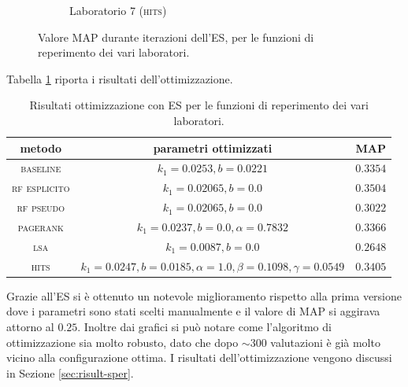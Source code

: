 \begin{figure}[H]
\begin{subfigure}{0.475\textwidth}
            \caption[]%
            {{\small Laboratorio 7 (\textsc{hits})}}    
            \label{fig:es_lab7}
        \end{subfigure}
        \caption[ The average and standard deviation of critical parameters ]
        {\small Valore MAP durante iterazioni dell'ES, per le funzioni di reperimento dei vari laboratori.} 
        \label{fig:es_all}
\end{figure}

Tabella \ref{tab:es} riporta i risultati dell'ottimizzazione.
\begin{table}[htpb]
\begin{center}
\begin{tabular}{|c|c|c|}
\hline
metodo & parametri ottimizzati & MAP \\
 \hline
\textsc{baseline} & $k_1 = 0.0253, b = 0.0221$ & $0.3354$ \\
\textsc{rf esplicito}  & $k_1 = 0.02065, b = 0.0$ & $0.3504$ \\
\textsc{rf pseudo}  & $k_1 = 0.02065, b = 0.0$ & $0.3022$ \\
\textsc{pagerank} & $k_1 = 0.0237, b = 0.0, \alpha=0.7832$ & $0.3366$ \\
\textsc{lsa} & $k_1 = 0.0087, b = 0.0$ & $0.2648$ \\
\textsc{hits} & $k_1 = 0.0247, b = 0.0185, \alpha=1.0, \beta=0.1098, \gamma=0.0549$ & $0.3405$ \\
\hline
\end{tabular}
\end{center}
\caption{Risultati ottimizzazione con ES per le funzioni di reperimento dei vari laboratori.}
\label{tab:es}
\end{table}

Grazie all'ES si \`e ottenuto un notevole miglioramento rispetto alla prima versione dove i parametri sono stati scelti manualmente e il valore di MAP si aggirava attorno al $0.25$. Inoltre dai grafici si pu\`o notare come l'algoritmo di ottimizzazione sia molto robusto, dato che dopo $\sim{300}$ valutazioni \`e gi\`a  molto vicino alla configurazione ottima. I risultati dell'ottimizzazione vengono discussi in Sezione \ref{sec:risult-sper}.


